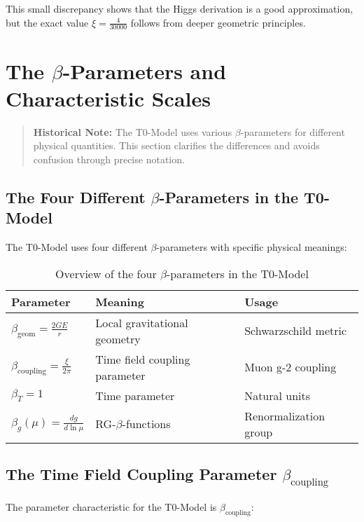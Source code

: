 \documentclass[12pt,a4paper]{report}
\newcommand{\xipar}{\xi}      %
\begin{document}
This small discrepancy shows that the Higgs derivation is a good approximation, but the exact value $\xipar = \frac{4}{30000}$ follows from deeper geometric principles.

\section{The $\beta$-Parameters and Characteristic Scales}\label{sec:beta_parameters}

\begin{quote}
	\textbf{Historical Note:} The T0-Model uses various $\beta$-parameters for different physical quantities. This section clarifies the differences and avoids confusion through precise notation.
\end{quote}

\subsection{The Four Different $\beta$-Parameters in the T0-Model}\label{subsec:four_beta_parameters}

The T0-Model uses four different $\beta$-parameters with specific physical meanings:

\begin{table}[h]
	\centering
	\begin{tabular}{|l|l|l|}
		\hline
		\textbf{Parameter} & \textbf{Meaning} & \textbf{Usage} \\
		\hline
		$\beta_{\text{geom}} = \frac{2GE}{r}$ & Local gravitational geometry & Schwarzschild metric \\
		$\beta_{\text{coupling}} = \frac{\xipar}{2\pi}$ & Time field coupling parameter & Muon g-2 coupling \\
		$\beta_T = 1$ & Time parameter & Natural units \\
		$\beta_g(\mu) = \frac{dg}{d\ln\mu}$ & RG-$\beta$-functions & Renormalization group \\
		\hline
	\end{tabular}
	\caption{Overview of the four $\beta$-parameters in the T0-Model}
\end{table}

\subsection{The Time Field Coupling Parameter $\beta_{\text{coupling}}$}\label{subsec:timefield_coupling_parameter}

The parameter characteristic for the T0-Model is $\beta_{\text{coupling}}$:
\end{document}
